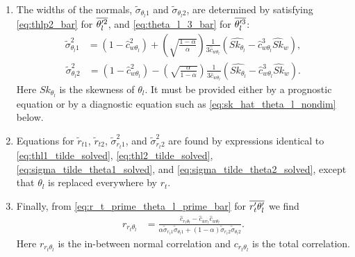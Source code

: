 \begin{enumerate}
    \item The widths of the normals, $\tilde{\sigma}_{\theta_l 1}$ and $\tilde{\sigma}_{\theta_l 2}$,
    are determined by satisfying \cref{eq:thlp2_bar} for $\overline{\theta_l'^2}$,
    and \cref{eq:theta_l_3_bar} for $\overline{\theta_l'^3}$:
    \begin{align}
        \label{eq:sigma_tilde_theta1_solved}
        \tilde{\sigma}_{\theta_l 1}^2
        &= \left(1-\widehat{c}_{w \theta_l}^2 \right) + \left(\sqrt{\frac{1 - \alpha}{\alpha}}\right) \frac{1}{3 \widehat{c}_{w \theta_l}} \left( \widehat{Sk_{\theta_l}} - \widehat{c}_{w \theta_l}^3 \widehat{Sk}_w \right),
    \end{align}
    \begin{align}
        \label{eq:sigma_tilde_theta2_solved}
        \tilde{\sigma}_{\theta_l 2}^2
        &= \left(1 - \widehat{c}_{w \theta_l}^2 \right) - \left(\sqrt{\frac{\alpha}{1 - \alpha}}\right) \frac{1}{3 \widehat{c}_{w \theta_l}} \left( \widehat{Sk_{\theta_l}} - \widehat{c}_{w \theta_l}^3 \widehat{Sk}_w \right).
    \end{align}
    Here $Sk_{\theta_l}$ is the skewness of $\theta_l$.
    It must be provided either by a prognostic equation or by a diagnostic equation
    such as \cref{eq:sk_hat_theta_l_nondim} below.

    \item Equations for $\tilde{r}_{t1}$, $\tilde{r}_{t2}$, $\tilde{\sigma}_{r_t 1}^2$,
    and $\tilde{\sigma}_{r_t 2}^2$ are found by expressions identical to \cref{eq:thl1_tilde_solved},
    \cref{eq:thl2_tilde_solved}, \cref{eq:sigma_tilde_theta1_solved},
    and \cref{eq:sigma_tilde_theta2_solved}, except that $\theta_l$ is replaced everywhere by $r_t$.

    \item Finally, from \cref{eq:r_t_prime_theta_l_prime_bar} for $\overline{r_t' \theta_l'}$ we find
    \begin{align}
        \label{eq:r_r_t_theta_l}
        r_{r_t \theta_l}
        &= \frac{\widehat{c}_{r_t \theta_l} - \widehat{c}_{w r_t} \widehat{c}_{w \theta_l}}
        {\alpha \tilde{\sigma}_{r_{t}1}\tilde{\sigma}_{\theta_{l}1} +
            (1-\alpha) \tilde{\sigma}_{r_{t}2} \tilde{\sigma}_{\theta_{l}2}}.
    \end{align}
    Here $r_{r_t \theta_l}$ is the in-between normal correlation and $c_{r_t \theta_l}$ is the total correlation.
\end{enumerate}